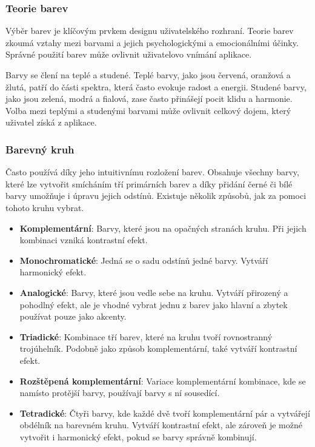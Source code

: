 \subsubsection{Teorie barev}
Výběr barev je klíčovým prvkem designu uživatelského rozhraní. Teorie barev zkoumá vztahy mezi barvami a jejich psychologickými a emocionálními účinky. Správné použití barev může ovlivnit uživatelovo vnímání aplikace.

Barvy se člení na teplé a studené. Teplé barvy, jako jsou červená, oranžová a žlutá, patří do části spektra, která často evokuje radost a energii. Studené barvy, jako jsou zelená, modrá a fialová, zase často přinášejí pocit klidu a harmonie. Volba mezi teplými a studenými barvami může ovlivnit celkový dojem, který uživatel získá z aplikace.

\subsubsection*{Barevný kruh}
Často používá díky jeho intuitivnímu rozložení barev. Obsahuje všechny barvy, které lze vytvořit smícháním tří primárních barev a díky přidání černé či bílé barvy umožňuje i úpravu jejich odstínů. Existuje několik způsobů, jak za pomoci tohoto kruhu vybrat.

\begin{itemize}
    \item \textbf{Komplementární}: Barvy, které jsou na opačných stranách kruhu. Při jejich kombinaci vzniká kontrastní efekt.
    \item \textbf{Monochromatické}: Jedná se o sadu odstínů jedné barvy. Vytváří harmonický efekt.
    \item \textbf{Analogické}: Barvy, které jsou vedle sebe na kruhu. Vytváří přirozený a pohodlný efekt, ale je vhodné vybrat jednu z barev jako hlavní a zbytek používat pouze jako akcenty.
    \item \textbf{Triadické}: Kombinace tří barev, které na kruhu tvoří rovnostranný trojúhelník. Podobně jako způsob komplementární, také vytváří kontrastní efekt.
    \item \textbf{Rozštěpená komplementární}: Variace komplementární kombinace, kde se namísto protější barvy, používají barvy s ní sousedící. 
    \item \textbf{Tetradické}: Čtyři barvy, kde každé dvě tvoří komplementární pár a vytvářejí obdélník na barevném kruhu. Vytváří kontrastní efekt, ale zároveň je možné vytvořit i harmonický efekt, pokud se barvy správně kombinují.
\end{itemize}

